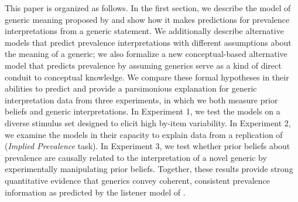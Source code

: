 \documentclass[floatsintext,doc]{apa6}
\newcommand{\ndg}[1]{{\textcolor{Green}{[ndg: #1]}}}
\begin{document}
This paper is organized as follows.
In the first section, we describe the model of generic meaning proposed by  and show how it makes predictions for prevalence interpretations from a generic statement.
We additionally describe alternative models that predict prevalence interpretations with different assumptions about the meaning of a generic; we also formalize a new conceptual-based alternative model that predicts prevalence by assuming generics serve as a kind of direct conduit to conceptual knowledge.
We compare these formal hypotheses in their abilities to predict and provide a parsimonious explanation for generic interpretation data from three experiments, in which we both measure prior beliefs and generic interpretations.
In Experiment 1, we test the models on a diverse stimulus set designed to elicit high by-item variability.
In Experiment 2, we examine the models in their capacity to explain data from a replication of  (\emph{Implied Prevalence} task).
In Experiment 3, we test whether prior beliefs about prevalence are causally related to the interpretation of a novel generic by experimentally manipulating prior beliefs.
Together, these results provide strong quantitative evidence that generics convey coherent, consistent prevalence information as predicted by the listener model of .



\end{document}

